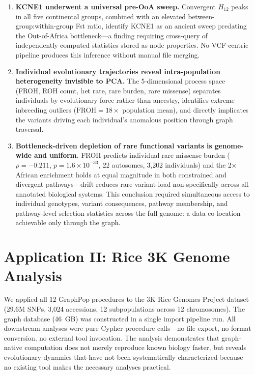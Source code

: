 \begin{enumerate}
\item \textbf{KCNE1 underwent a universal pre-OoA sweep.} Convergent $H_{12}$ peaks in all five continental groups, combined with an elevated between-group:within-group Fst ratio, identify KCNE1 as an ancient sweep predating the Out-of-Africa bottleneck---a finding requiring cross-query of independently computed statistics stored as node properties. No VCF-centric pipeline produces this inference without manual file merging.

\item \textbf{Individual evolutionary trajectories reveal intra-population heterogeneity invisible to PCA.} The 5-dimensional process space (FROH, ROH count, het rate, rare burden, rare missense) separates individuals by evolutionary force rather than ancestry, identifies extreme inbreeding outliers ($\text{FROH} = 18 \times$ population mean), and directly implicates the variants driving each individual's anomalous position through graph traversal.

\item \textbf{Bottleneck-driven depletion of rare functional variants is genome-wide and uniform.} FROH predicts individual rare missense burden ($\rho = -0.211$, $p = 1.6 \times 10^{-33}$, 22 autosomes, 3{,}202 individuals) and the 2$\times$ African enrichment holds at equal magnitude in both constrained and divergent pathways---drift reduces rare variant load non-specifically across all annotated biological systems. This conclusion required simultaneous access to individual genotypes, variant consequences, pathway membership, and pathway-level selection statistics across the full genome: a data co-location achievable only through the graph.
\end{enumerate}

\section*{Application II: Rice 3K Genome Analysis}

We applied all 12 GraphPop procedures to the 3K Rice Genomes Project\cite{wang2018genomic} dataset (29.6M SNPs, 3{,}024 accessions, 12 subpopulations across 12 chromosomes). The graph database (46~GB) was constructed in a single import pipeline run. All downstream analyses were pure Cypher procedure calls---no file export, no format conversion, no external tool invocation. The analysis demonstrates that graph-native computation does not merely reproduce known biology faster, but reveals evolutionary dynamics that have not been systematically characterized because no existing tool makes the necessary analyses practical.

